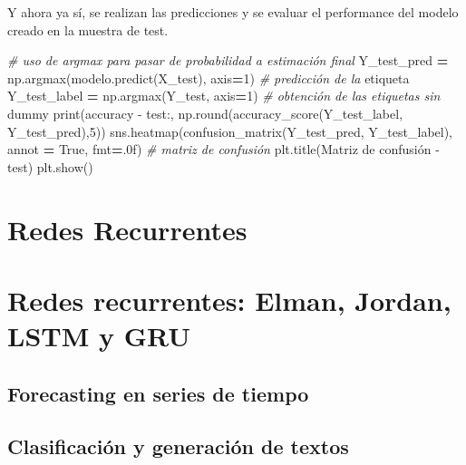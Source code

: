 \documentclass[
  a4paper,
  DIV=11,
  numbers=noendperiod]{scrreprt}
\newenvironment{Shaded}{\begin{snugshade}}{\end{snugshade}}
\newcommand{\BuiltInTok}[1]{#1}
\newcommand{\CommentTok}[1]{\textcolor[rgb]{0.56,0.35,0.01}{\textit{#1}}}
\newcommand{\DecValTok}[1]{\textcolor[rgb]{0.00,0.00,0.81}{#1}}
\newcommand{\NormalTok}[1]{#1}
\newcommand{\OperatorTok}[1]{\textcolor[rgb]{0.81,0.36,0.00}{\textbf{#1}}}
\newcommand{\StringTok}[1]{\textcolor[rgb]{0.31,0.60,0.02}{#1}}
\newcommand{\VariableTok}[1]{\textcolor[rgb]{0.00,0.00,0.00}{#1}}
\begin{document}
Y ahora ya sí, se realizan las predicciones y se evaluar el performance
del modelo creado en la muestra de test.

\begin{Shaded}
\begin{Highlighting}[numbers=left,,]
\CommentTok{\# uso de argmax para pasar de probabilidad a estimación final}
\NormalTok{Y\_test\_pred }\OperatorTok{=}\NormalTok{ np.argmax(modelo.predict(X\_test), axis}\OperatorTok{=}\DecValTok{1}\NormalTok{) }\CommentTok{\# predicción de la}
\NormalTok{etiqueta}
\NormalTok{Y\_test\_label }\OperatorTok{=}\NormalTok{ np.argmax(Y\_test, axis}\OperatorTok{=}\DecValTok{1}\NormalTok{) }\CommentTok{\# obtención de las etiquetas sin}
\NormalTok{dummy}
\BuiltInTok{print}\NormalTok{(}\StringTok{\textquotesingle{}accuracy {-} test:\textquotesingle{}}\NormalTok{, np.}\BuiltInTok{round}\NormalTok{(accuracy\_score(Y\_test\_label,}
\NormalTok{Y\_test\_pred),}\DecValTok{5}\NormalTok{))}
\NormalTok{sns.heatmap(confusion\_matrix(Y\_test\_pred, Y\_test\_label), annot }\OperatorTok{=} \VariableTok{True}\NormalTok{,}
\NormalTok{fmt}\OperatorTok{=}\StringTok{\textquotesingle{}.0f\textquotesingle{}}\NormalTok{) }\CommentTok{\# matriz de confusión}
\NormalTok{plt.title(}\StringTok{\textquotesingle{}Matriz de confusión {-} test\textquotesingle{}}\NormalTok{)}
\NormalTok{plt.show()}
\end{Highlighting}
\end{Shaded}

\section{Redes Recurrentes}\label{redes-recurrentes}

\section{Redes recurrentes: Elman, Jordan, LSTM y
GRU}\label{redes-recurrentes-elman-jordan-lstm-y-gru}

\subsection{Forecasting en series de
tiempo}\label{forecasting-en-series-de-tiempo}

\subsection{Clasificación y generación de
textos}\label{clasificaciuxf3n-y-generaciuxf3n-de-textos}
\end{document}

